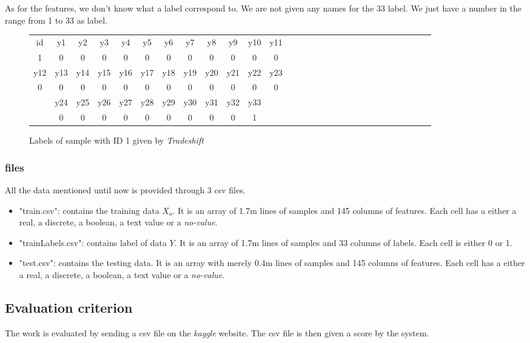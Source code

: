 		As for the features, we don't know what a label correspond to. We are not given any names for the 33 label. We just have a number in the range from 1 to 33 as label.
		
		\begin{figure}
			\centering
			\begin{tabular}{ccccccccccccccccccccccccccccc}
				id & y1 & y2 & y3 & y4 & y5 & y6 & y7 & y8 & y9 & y10 & y11 \\ 
				1 & 0 & 0 & 0 & 0 & 0 & 0 & 0 & 0 & 0 & 0 & 0 \\
				\hline

				y12 & y13 & y14 & y15 & y16 & y17 & y18 & y19 & y20 & y21 & y22 & y23 \\
				0 & 0 & 0 & 0 & 0 & 0 & 0 & 0 & 0 & 0 & 0 & 0 \\
				\hline

				&y24 & y25 & y26 & y27 & y28 & y29 & y30 & y31 & y32 & y33 \\
				&0 & 0 & 0 & 0 & 0 & 0 & 0 & 0 & 0 & 1

			\end{tabular}
			\caption{Labels of sample with ID 1 given by \textit{Tradeshift}}
			\label{fig:sample1_labels}
		\end{figure}


	\subsubsection{files}
		All the data mentioned until now is provided through 3 csv files. 

		\begin{itemize}
			\item "train.csv": contains the training data $X_o$. It is an array of 1.7m lines of samples and 145 columns of features. Each cell has a either a real, a discrete, a boolean, a text value or a \textit{no-value}.
			\item "trainLabels.csv": contains label of data $Y$. It is an array of 1.7m lines of samples and 33 columns of labels. Each cell is either 0 or 1.
			\item "test.csv": contains the testing data. It is an array with merely 0.4m lines of samples and 145 columns of features. Each cell has a either a real, a discrete, a boolean, a text value or a \textit{no-value}.
		\end{itemize}



	\subsection{Evaluation criterion}
		The work is evaluated by sending a csv file on the \textit{kaggle} website. The csv file is then given a score by the system.


